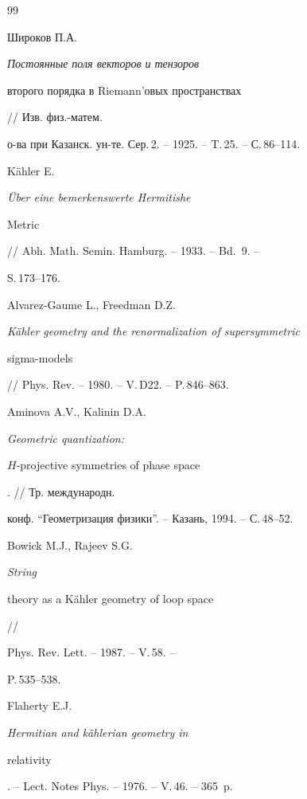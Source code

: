 \begin{thebibliography}{99}







Широков П.А. {\em Постоянные поля векторов и тензоров


второго порядка в Riemann'овых пространствах} // Изв. физ.-матем.


о-ва при Казанск. ун-те. Сер.\,2. -- 1925. -- T.\,25. -- С.\,86--114.







K\"ahler E. {\em \"Uber eine bemerkenswerte Hermitishe


Metric} // Abh. Math. Semin. Hamburg. -- 1933. -- Bd.\, 9. --


S.\,173--176.







Alvarez-Gaume L., Freedman D.Z.


{\em K\"ahler geometry and the renormalization of supersymmetric


sigma-models} // Phys. Rev. -- 1980. -- V.\,D22. -- P.\,846--863.







Aminova A.V., Kalinin D.A. {\em Geometric quantization:


$H$-projective symmetries of phase space}. // Тр. международн.


конф. ``Геометризация физики''. -- Казань, 1994. -- С.\,48--52.







Bowick M.J., Rajeev S.G. {\em String


theory as a K\"ahler geometry of loop space} //


Phys. Rev. Lett. -- 1987. -- V.\,58. --


P.\,535--538.







Flaherty E.J. {\em Hermitian and k\"ahlerian geometry in


relativity}. -- Lect. Notes Phys. -- 1976. -- V.\,46. -- 365~p.






\end{thebibliography}
